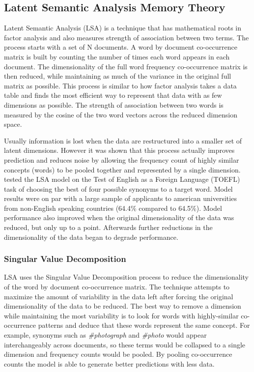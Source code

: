 \documentclass[man,floatsintext,donotrepeattitle]{apa6}
\begin{document}
\subsection{Latent Semantic Analysis Memory Theory}

Latent Semantic Analysis \parencite{Landauer1997} (LSA) is a technique that has mathematical roots in factor analysis and also measures strength of association between two terms.
The process starts with a set of N documents.
A word by document co-occurrence matrix is built by counting the number of times each word appears in each document.
The dimensionality of the full word frequency co-occurrence matrix is then reduced, while maintaining as much of the variance in the original full matrix as possible.
This process is similar to how factor analysis takes a data table and finds the most efficient way to represent that data with as few dimensions as possible.
The strength of association between two words is measured by the cosine of the two word vectors across the reduced dimension space.

Usually information is lost when the data are restructured into a smaller set of latent dimensions.
However it was shown that this process actually improves prediction and reduces noise by allowing the frequency count of highly similar concepts (words) to be pooled together and represented by a single dimension.
\textcite{Landauer1997} tested the LSA model on the Test of English as a Foreign Language (TOEFL) task of choosing the best of four possible synonyms to a target word.
Model results were on par with a large sample of applicants to american universities from non-English speaking countries (64.4\% compared to 64.5\%).
Model performance also improved when the original dimensionality of the data was reduced, but only up to a point.
Afterwards further reductions in the dimensionality of the data began to degrade performance.

\subsubsection{Singular Value Decomposition}

LSA uses the Singular Value Decomposition process to reduce the dimensionality of the word by document co-occurrence matrix.
The technique attempts to maximize the amount of variability in the data left after forcing the original dimensionality of the data to be reduced.
The best way to remove a dimension while maintaining the most variability is to look for words with highly-similar co-occurrence patterns and deduce that these words represent the same concept.
For example, synonyms such as \emph{\#photograph} and \emph{\#photo} would appear interchangeably across documents, so these terms would be collapsed to a single dimension and frequency counts would be pooled.
By pooling co-occurrence counts the model is able to generate better predictions with less data.
\end{document}
